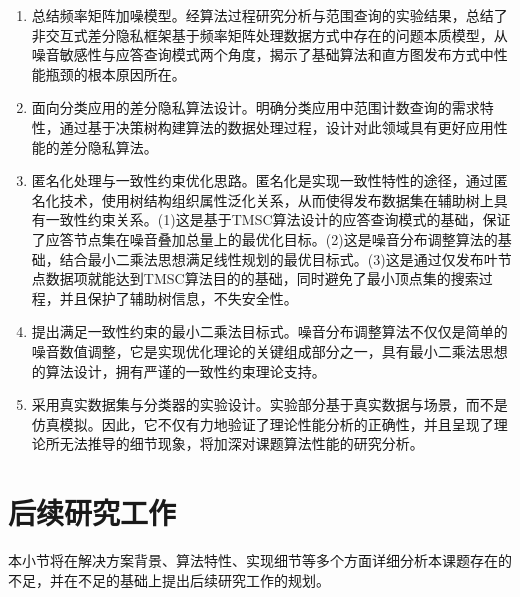 \begin{enumerate}
	\item 总结频率矩阵加噪模型。经算法过程研究分析与范围查询的实验结果，总结了非交互式差分隐私框架基于频率矩阵处理数据方式中存在的问题本质模型，从噪音敏感性与应答查询模式两个角度，揭示了基础算法和直方图发布方式中性能瓶颈的根本原因所在。
	\item 面向分类应用的差分隐私算法设计。明确分类应用中范围计数查询的需求特性，通过基于决策树构建算法的数据处理过程，设计对此领域具有更好应用性能的差分隐私算法。
	\item 匿名化处理与一致性约束优化思路。匿名化是实现一致性特性的途径，通过匿名化技术，使用树结构组织属性泛化关系，从而使得发布数据集在辅助树上具有一致性约束关系。(1)这是基于TMSC算法设计的应答查询模式的基础，保证了应答节点集在噪音叠加总量上的最优化目标。(2)这是噪音分布调整算法的基础，结合最小二乘法思想满足线性规划的最优目标式。(3)这是通过仅发布叶节点数据项就能达到TMSC算法目的的基础，同时避免了最小顶点集的搜索过程，并且保护了辅助树信息，不失安全性。
	\item 提出满足一致性约束的最小二乘法目标式。噪音分布调整算法不仅仅是简单的噪音数值调整，它是实现优化理论的关键组成部分之一，具有最小二乘法思想的算法设计，拥有严谨的一致性约束理论支持。
	\item 采用真实数据集与分类器的实验设计。实验部分基于真实数据与场景，而不是仿真模拟。因此，它不仅有力地验证了理论性能分析的正确性，并且呈现了理论所无法推导的细节现象，将加深对课题算法性能的研究分析。
\end{enumerate}	
\section{后续研究工作}

本小节将在解决方案背景、算法特性、实现细节等多个方面详细分析本课题存在的不足，并在不足的基础上提出后续研究工作的规划。


